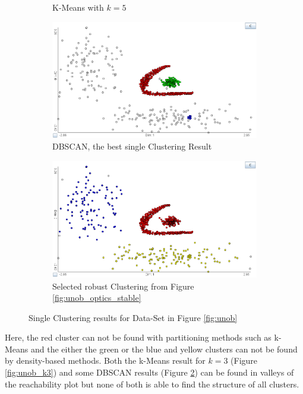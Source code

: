 \documentclass[
	a4paper,
	english,
	twoside,
	openright,               
	11pt                            
	]{report}
\begin{document}
\begin{figure}[h]
\begin{subfigure}[t]{.49\textwidth}
  \caption{K-Means with $k=5$}
  \label{fig:unob_k5ex}
\end{subfigure}
\hfill
\begin{subfigure}[t]{.49\textwidth}
  \centering
  \includegraphics[width=.95\linewidth]{unob_best}
  \caption{DBSCAN, the best single Clustering Result}
  \label{fig:unob_best}
\end{subfigure}
\medskip
\begin{subfigure}[t]{.49\textwidth}
	\centering
	\includegraphics[width=.95\linewidth]{unob_stable}
	\caption{Selected robust Clustering from Figure \ref{fig:unob_optics_stable}}
	\label{fig:unob_stable}
\end{subfigure}
\caption{Single Clustering results for Data-Set in Figure \ref{fig:unob}}
\label{fig:single}
\end{figure}


Here, the red cluster can not be found with partitioning methods such as k-Means and the either the green or the blue and yellow clusters can not be found by density-based methods. Both the k-Means result for $k=3$ (Figure \ref{fig:unob_k3}) and some DBSCAN results (Figure \ref{fig:unob_best}) can be found in valleys of the reachability plot but none of both is able to find the structure of all clusters.
\end{document}
